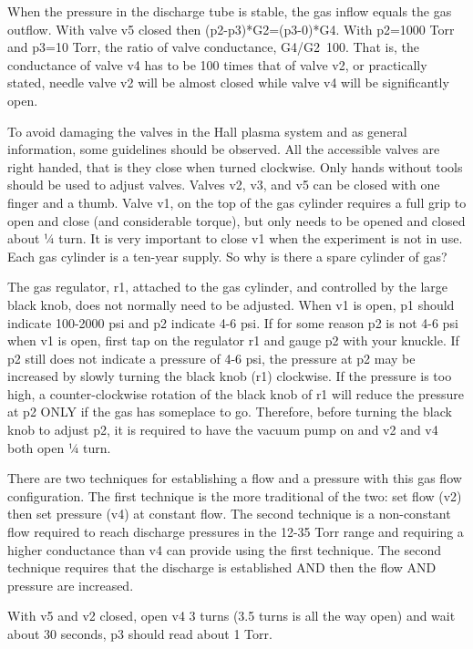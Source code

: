 \documentclass{../lab}
\begin{document}
When the pressure in the discharge tube is stable, the gas inflow equals the gas outflow. With valve v5 closed then (p2-p3)*G2=(p3-0)*G4. With p2=1000 Torr and p3=10 Torr, the ratio of valve conductance, G4/G2~100. That is, the conductance of valve v4 has to be 100 times that of valve v2, or practically stated, needle valve v2 will be almost closed while valve v4 will be significantly open.

To avoid damaging the valves in the Hall plasma system and as general information, some guidelines should be observed. All the accessible valves are right handed, that is they close when turned clockwise. Only hands without tools should be used to adjust valves. Valves v2, v3, and v5 can be closed with one finger and a thumb. Valve v1, on the top of the gas cylinder requires a full grip to open and close (and considerable torque), but only needs to be opened and closed about ¼ turn. It is very important to close v1 when the experiment is not in use. Each gas cylinder is a ten-year supply. So why is there a spare cylinder of gas?

The gas regulator, r1, attached to the gas cylinder, and controlled by the large black knob, does not normally need to be adjusted. When v1 is open, p1 should indicate 100-2000 psi and p2 indicate 4-6 psi. If for some reason p2 is not 4-6 psi when v1 is open, first tap on the regulator r1 and gauge p2 with your knuckle. If p2 still does not indicate a pressure of 4-6 psi, the pressure at p2 may be increased by slowly turning the black knob (r1) clockwise. If the pressure is too high, a counter-clockwise rotation of the black knob of r1 will reduce the pressure at p2 ONLY if the gas has someplace to go. Therefore, before turning the black knob to adjust p2, it is required to have the vacuum pump on and v2 and v4 both open ¼ turn.

There are two techniques for establishing a flow and a pressure with this gas flow configuration. The first technique is the more traditional of the two: set flow (v2) then set pressure (v4) at constant flow. The second technique is a non-constant flow required to reach discharge pressures in the 12-35 Torr range and requiring a higher conductance than v4 can provide using the first technique. The second technique requires that the discharge is established AND then the flow AND pressure are increased.

With v5 and v2 closed, open v4 3 turns (3.5 turns is all the way open) and wait about 30 seconds, p3 should read about 1 Torr.
\end{document}
